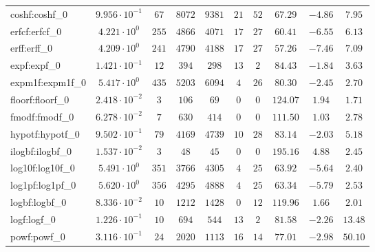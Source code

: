 \begin{tabular}{|l|c|c|c|c|c|c|c|c|c|}
coshf:coshf\_0           & $ 9.956 \cdot 10^{-1} $ & $ 67     $ & $ 8072   $ & $ 9381   $ & $ 21  $ & $ 52  $ & $ 67.29       $ & $ -4.86   $ & $ 7.95    $ \\
erfcf:erfcf\_0           & $ 4.221 \cdot 10^{0}  $ & $ 255    $ & $ 4866   $ & $ 4071   $ & $ 17  $ & $ 27  $ & $ 60.41       $ & $ -6.55   $ & $ 6.13    $ \\
erff:erff\_0             & $ 4.209 \cdot 10^{0}  $ & $ 241    $ & $ 4790   $ & $ 4188   $ & $ 17  $ & $ 27  $ & $ 57.26       $ & $ -7.46   $ & $ 7.09    $ \\
expf:expf\_0             & $ 1.421 \cdot 10^{-1} $ & $ 12     $ & $ 394    $ & $ 298    $ & $ 13  $ & $ 2   $ & $ 84.43       $ & $ -1.84   $ & $ 3.63    $ \\
expm1f:expm1f\_0         & $ 5.417 \cdot 10^{0}  $ & $ 435    $ & $ 5203   $ & $ 6094   $ & $ 4   $ & $ 26  $ & $ 80.30       $ & $ -2.45   $ & $ 2.70    $ \\
floorf:floorf\_0         & $ 2.418 \cdot 10^{-2} $ & $ 3      $ & $ 106    $ & $ 69     $ & $ 0   $ & $ 0   $ & $ 124.07      $ & $ 1.94    $ & $ 1.71    $ \\
fmodf:fmodf\_0           & $ 6.278 \cdot 10^{-2} $ & $ 7      $ & $ 630    $ & $ 414    $ & $ 0   $ & $ 0   $ & $ 111.50      $ & $ 1.03    $ & $ 2.78    $ \\
hypotf:hypotf\_0         & $ 9.502 \cdot 10^{-1} $ & $ 79     $ & $ 4169   $ & $ 4739   $ & $ 10  $ & $ 28  $ & $ 83.14       $ & $ -2.03   $ & $ 5.18    $ \\
ilogbf:ilogbf\_0         & $ 1.537 \cdot 10^{-2} $ & $ 3      $ & $ 48     $ & $ 45     $ & $ 0   $ & $ 0   $ & $ 195.16      $ & $ 4.88    $ & $ 2.45    $ \\
log10f:log10f\_0         & $ 5.491 \cdot 10^{0}  $ & $ 351    $ & $ 3766   $ & $ 4305   $ & $ 4   $ & $ 25  $ & $ 63.92       $ & $ -5.64   $ & $ 2.40    $ \\
log1pf:log1pf\_0         & $ 5.620 \cdot 10^{0}  $ & $ 356    $ & $ 4295   $ & $ 4888   $ & $ 4   $ & $ 25  $ & $ 63.34       $ & $ -5.79   $ & $ 2.53    $ \\
logbf:logbf\_0           & $ 8.336 \cdot 10^{-2} $ & $ 10     $ & $ 1212   $ & $ 1428   $ & $ 0   $ & $ 12  $ & $ 119.96      $ & $ 1.66    $ & $ 2.01    $ \\
logf:logf\_0             & $ 1.226 \cdot 10^{-1} $ & $ 10     $ & $ 694    $ & $ 544    $ & $ 13  $ & $ 2   $ & $ 81.58       $ & $ -2.26   $ & $ 13.48   $ \\
powf:powf\_0             & $ 3.116 \cdot 10^{-1} $ & $ 24     $ & $ 2020   $ & $ 1113   $ & $ 16  $ & $ 14  $ & $ 77.01       $ & $ -2.98   $ & $ 50.10   $ \\

\end{tabular}
